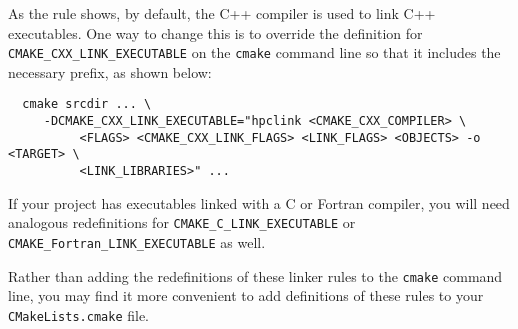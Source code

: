 \documentclass[11pt,letterpaper]{report}
\begin{document}
\noindent
As the rule shows, by default, the C++ compiler is used to link C++ executables. One way to change this is to override the definition for \verb|CMAKE_CXX_LINK_EXECUTABLE|  on the {\tt cmake} command line so that it includes the  necessary \hpclink{} prefix, as shown below:

\begin{verbatim}
  cmake srcdir ... \
     -DCMAKE_CXX_LINK_EXECUTABLE="hpclink <CMAKE_CXX_COMPILER> \
          <FLAGS> <CMAKE_CXX_LINK_FLAGS> <LINK_FLAGS> <OBJECTS> -o <TARGET> \
          <LINK_LIBRARIES>" ...
\end{verbatim}

\noindent
If your project has executables linked with a C or Fortran compiler, you will need analogous redefinitions for \verb|CMAKE_C_LINK_EXECUTABLE| or  \verb|CMAKE_Fortran_LINK_EXECUTABLE| as well.

Rather than adding the redefinitions of these linker rules to the {\tt cmake} command line,
you may find it more convenient to add definitions of these rules to your {\tt CMakeLists.cmake} file.





\begin{comment}
  hpcviewer shows a loop where there is none: bad line information or compiler-generated (scalarization, copy loop)

  hpcviewer shows a call site where there is none: compiler-inserted call

  possible question: What happens if I forget to run hpcstruct?
No hpcstruct =
  really crazy procedure & loop bounds
  no inlining detection!


  Note: Beware of kernels 2.6.28 through 2.6.29.2.  These kernels have a rare asynchronous signal race condition where floating point registers are not restored correctly.

  Perf-events kernels 2.6.32-2.6.?? + PAPI = bug where you get a SIGIO in the
  middle of a signal handler.

\end{comment}



\end{document}
